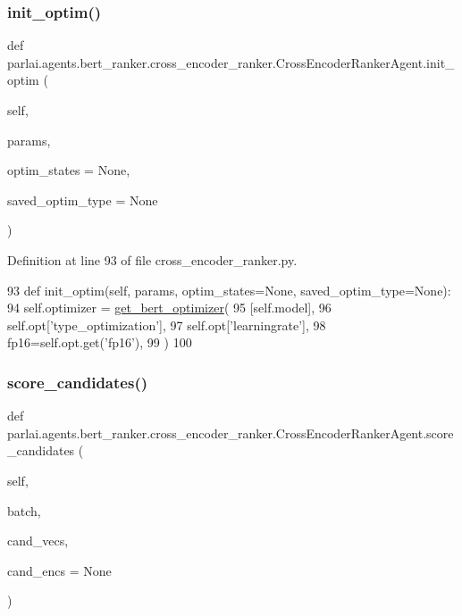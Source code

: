 \subsubsection{\texorpdfstring{init\+\_\+optim()}{init\_optim()}}
{\footnotesize\ttfamily def parlai.\+agents.\+bert\+\_\+ranker.\+cross\+\_\+encoder\+\_\+ranker.\+Cross\+Encoder\+Ranker\+Agent.\+init\+\_\+optim (\begin{DoxyParamCaption}\item[{}]{self,  }\item[{}]{params,  }\item[{}]{optim\+\_\+states = {\ttfamily None},  }\item[{}]{saved\+\_\+optim\+\_\+type = {\ttfamily None} }\end{DoxyParamCaption})}



Definition at line 93 of file cross\+\_\+encoder\+\_\+ranker.\+py.


\begin{DoxyCode}
93     \textcolor{keyword}{def }init\_optim(self, params, optim\_states=None, saved\_optim\_type=None):
94         self.optimizer = \hyperlink{namespaceparlai_1_1agents_1_1bert__ranker_1_1helpers_a7a144c1f6c9af7925e754b9b61c0e6fb}{get\_bert\_optimizer}(
95             [self.model],
96             self.opt[\textcolor{stringliteral}{'type\_optimization'}],
97             self.opt[\textcolor{stringliteral}{'learningrate'}],
98             fp16=self.opt.get(\textcolor{stringliteral}{'fp16'}),
99         )
100 
\end{DoxyCode}
\mbox{\label{classparlai_1_1agents_1_1bert__ranker_1_1cross__encoder__ranker_1_1CrossEncoderRankerAgent_a8d75c4d4bddd44381b232a974469c432}} 
\subsubsection{\texorpdfstring{score\+\_\+candidates()}{score\_candidates()}}
{\footnotesize\ttfamily def parlai.\+agents.\+bert\+\_\+ranker.\+cross\+\_\+encoder\+\_\+ranker.\+Cross\+Encoder\+Ranker\+Agent.\+score\+\_\+candidates (\begin{DoxyParamCaption}\item[{}]{self,  }\item[{}]{batch,  }\item[{}]{cand\+\_\+vecs,  }\item[{}]{cand\+\_\+encs = {\ttfamily None} }\end{DoxyParamCaption})}



